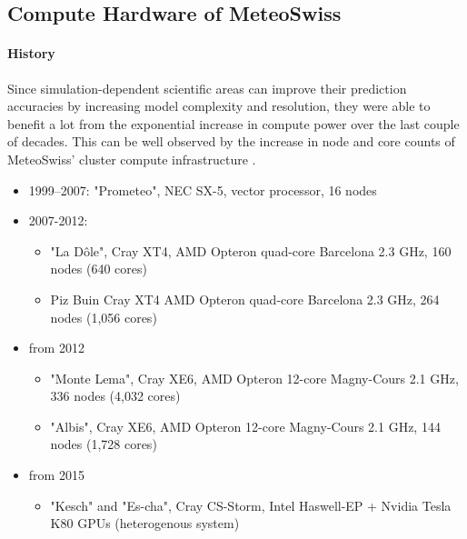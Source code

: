 \subsection{Compute Hardware of MeteoSwiss}

\paragraph{History}
Since simulation-dependent scientific areas can improve their prediction accuracies by increasing model complexity and resolution, they were able to benefit a lot from the exponential increase in compute power over the last couple of decades. This can be well observed by the increase in node and core counts of MeteoSwiss' cluster compute infrastructure \cite{label52}. 
\begin{itemize}
	\item 1999–2007: "Prometeo", NEC SX-5, vector processor, 16 nodes
	\item 2007-2012: 
	\begin{itemize}
		\item "La Dôle", Cray XT4, AMD Opteron quad-core Barcelona 2.3 GHz, 160 nodes (640 cores) 
		\item Piz Buin 	Cray XT4 	AMD Opteron quad-core Barcelona 2.3 GHz, 264 nodes (1,056 cores) 
	\end{itemize}
	\item from 2012
	\begin{itemize}
		\item "Monte Lema", Cray XE6, AMD Opteron 12-core Magny-Cours 2.1 GHz, 336 nodes (4,032 cores) 
		\item "Albis", Cray XE6, AMD Opteron 12-core Magny-Cours 2.1 GHz, 144 nodes (1,728 cores) 
	\end{itemize}
	\item from 2015
	\begin{itemize}
		\item "Kesch" and "Es-cha", Cray CS-Storm, Intel Haswell-EP + Nvidia Tesla K80 GPUs (heterogenous system)
	\end{itemize}
\end{itemize}

